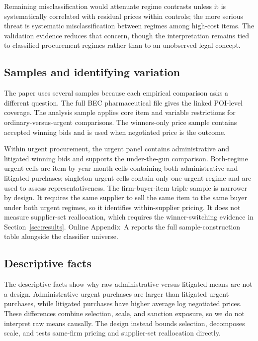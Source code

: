 Remaining misclassification would attenuate regime contrasts unless it is systematically correlated with residual prices within controls; the more serious threat is systematic misclassification between regimes among high-cost items. The validation evidence reduces that concern, though the interpretation remains tied to classified procurement regimes rather than to an unobserved legal concept.

\subsection{Samples and identifying variation}
\label{subsec:samples}

The paper uses several samples because each empirical comparison asks a different question. The full BEC pharmaceutical file gives the linked POI-level coverage. The analysis sample applies core item and variable restrictions for ordinary-versus-urgent comparisons. The winners-only price sample contains \BPnegNobs{} accepted winning bids and is used when negotiated price is the outcome.

Within urgent procurement, the urgent panel contains administrative and litigated winning bids and supports the under-the-gun comparison. Both-regime urgent cells are item-by-year-month cells containing both administrative and litigated purchases; singleton urgent cells contain only one urgent regime and are used to assess representativeness. The firm-buyer-item triple sample is narrower by design. It requires the same supplier to sell the same item to the same buyer under both urgent regimes, so it identifies within-supplier pricing. It does not measure supplier-set reallocation, which requires the winner-switching evidence in Section~\ref{sec:results}. Online Appendix~A reports the full sample-construction table alongside the classifier universe.

\subsection{Descriptive facts}
\label{subsec:descriptives}

The descriptive facts show why raw administrative-versus-litigated means are not a design. Administrative urgent purchases are larger than litigated urgent purchases, while litigated purchases have higher average log negotiated prices. These differences combine selection, scale, and sanction exposure, so we do not interpret raw means causally. The design instead bounds selection, decomposes scale, and tests same-firm pricing and supplier-set reallocation directly.
